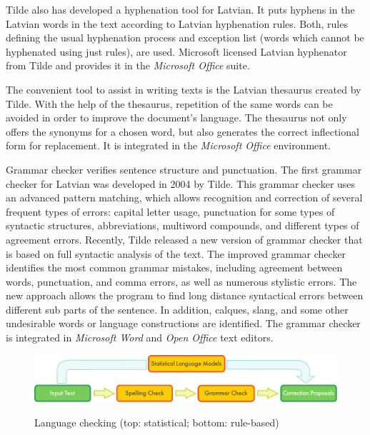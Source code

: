 \begin{multicols}{2}
Tilde also has developed a hyphenation tool for Latvian.
It puts hyphens in the Latvian words in the text according to Latvian hyphenation rules.
Both, rules defining the usual hyphenation process and exception list (words which cannot be hyphenated using just rules), are used.
Microsoft licensed Latvian hyphenator from Tilde and provides it in the \textit{Microsoft Office }suite.

The convenient tool to assist in writing texts is the Latvian thesaurus created by Tilde.
With the help of the thesaurus, repetition of the same words can be avoided in order to improve the document's language.
The thesaurus not only offers the synonyms for a chosen word, but also generates the correct inflectional form for replacement.
It is integrated in the \textit{Microsoft Office} environment.

Grammar checker verifies sentence structure and punctuation.
The first grammar checker for Latvian was developed in 2004 by Tilde.
This grammar checker uses an advanced pattern matching, which allows recognition and correction of several frequent types of errors: capital letter usage, punctuation for some types of syntactic structures, abbreviations, multiword compounds, and different types of agreement errors.
Recently, Tilde released a new version of grammar checker that is based on full syntactic analysis of the text.
The improved grammar checker identifies the most common grammar mistakes, including agreement between words, punctuation, and comma errors, as well as numerous stylistic errors.
The new approach allows the program to find long distance syntactical errors between different sub parts of the sentence.
In addition, calques, slang, and some other undesirable words or language constructions are identified.
The grammar checker is integrated in \textit{Microsoft Word} and \textit{Open Office} text editors.

\begin{figure}[htb]
  \center
  \includegraphics[width=\textwidth]{../_media/english/language_checking}
  \caption{Language checking (top: statistical; bottom: rule-based)}
   \label{fig:langcheckingaarch_en}
\end{figure}


\end{multicols}
